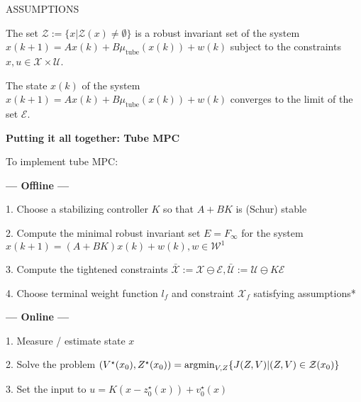 ASSUMPTIONS %

\begin{theorem}
	The set $\mathcal{Z} := \{x|\mathcal{Z}(x)\neq \emptyset\}$
	is a robust invariant set of the system
	$x(k+1)= Ax(k)+B\mu_\text{tube}(x(k)) + w(k)$
	subject to the constraints
	$x, u \in \mathcal{X} \times \mathcal{U}$.
\end{theorem}



\begin{theorem}
	The state $x(k)$ of the system
	$x(k+1)= Ax(k)+B\mu_\text{tube}(x(k)) + w(k)$
	converges  to the  limit of the set $\mathcal{E}$.
\end{theorem}

\textbf{Putting it all together: Tube MPC}

To implement tube MPC:

\textbf{— Offline —}

1. Choose a stabilizing controller $K$
so that $A + BK$ is (Schur) stable

2. Compute the minimal robust invariant set
$E = F_\infty$ for the system
$x(k+1) = (A + BK)x(k) + w(k), w \in \mathcal{W}^1$

3. Compute the tightened constraints
$\bar{\mathcal{X}} := \mathcal{X} \ominus \mathcal{E},
	\bar{\mathcal{U}} := \mathcal{U} \ominus K\mathcal{E}$

4. Choose terminal weight function $l_f$
and constraint $\mathcal{X}_f$
satisfying assumptions* %

\textbf{— Online —}

1. Measure / estimate state $x$

2. Solve the problem
$(V^\star(x_0),Z^\star(x_0))=
	\operatorname{argmin}_{V,Z}\{J(Z,V)|(Z,V)\in\mathcal{Z}(x_0)\}$

3. Set the input to
$u	=	K(x-z_0^\star(x))+v_0^\star(x)$


